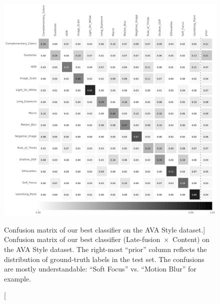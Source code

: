 \begin{figure}[ht!]
\centering
\includegraphics[width=\linewidth]{../style/figures/evaluation/ava_style_conf.pdf}
\caption
[Confusion matrix of our best classifier on the AVA Style dataset.]
{
Confusion matrix of our best classifier (\mbox{Late-fusion $\times$ Content}) on the AVA Style dataset.
The right-most ``prior'' column reflects the distribution of ground-truth labels in the test set.
The confusions are mostly understandable: ``Soft Focus'' vs. ``Motion Blur'' for example.
}
\label{fig:ava_style_conf}
\end{figure}

